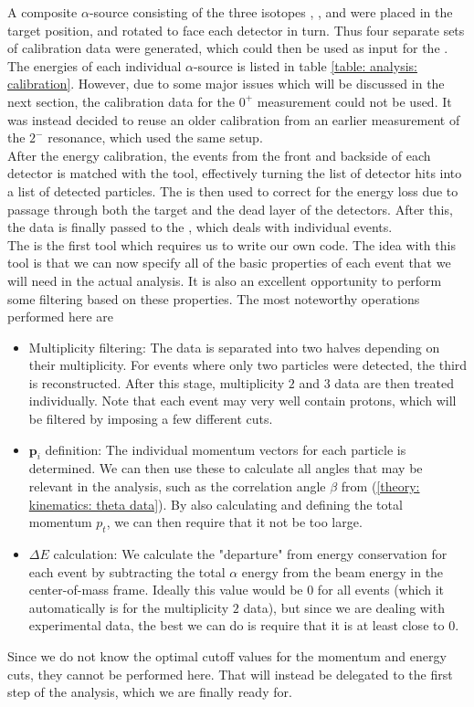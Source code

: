 A composite $\alpha$-source consisting of the three isotopes , , and  were placed in the target position, and rotated to face each detector in turn. Thus four separate sets of calibration data were generated, which could then be used as input for the \Calibrator{}. The energies of each individual $\alpha$-source is listed in table \ref{table: analysis: calibration}. However, due to some major issues which will be discussed in the next section, the calibration data for the $0^+$ measurement could not be used. It was instead decided to reuse an older calibration from an earlier measurement of the $2^-$ resonance, which used the same setup. \\

After the energy calibration, the events from the front and backside of each detector is matched with the \Sorter{} tool, effectively turning the list of detector hits into a list of detected particles. The \Identifier{} is then used to correct for the energy loss due to passage through both the target and the dead layer of the detectors. After this, the data is finally passed to the \EventBuilder{}, which deals with individual events. \\

The \EventBuilder{} is the first tool which requires us to write our own code. The idea with this tool is that we can now specify all of the basic properties of each event that we will need in the actual analysis. It is also an excellent opportunity to perform some filtering based on these properties. The most noteworthy operations performed here are
\begin{itemize}
	\item Multiplicity filtering: The data is separated into two halves depending on their multiplicity. For events where only two particles were detected, the third is reconstructed. After this stage, multiplicity $2$ and $3$ data are then treated individually. Note that each event may very well contain protons, which will be filtered by imposing a few different cuts. 
	
	\item $\bm{p}_i$ definition: The individual momentum vectors for each particle is determined. We can then use these to calculate all angles that may be relevant in the analysis, such as the correlation angle $\beta$ from (\ref{theory: kinematics: theta data}). By also calculating and defining the total momentum $p_t$, we can then require that it not be too large. 
	
	\item $\Delta E$ calculation: We calculate the "departure" from energy conservation for each event by subtracting the total $\alpha$ energy from the beam energy in the center-of-mass frame. Ideally this value would be $0$ for all events (which it automatically is for the multiplicity $2$ data), but since we are dealing with experimental data, the best we can do is require that it is at least close to $0$. 
\end{itemize}
Since we do not know the optimal cutoff values for the momentum and energy cuts, they cannot be performed here. That will instead be delegated to the first step of the analysis, which we are finally ready for. 
